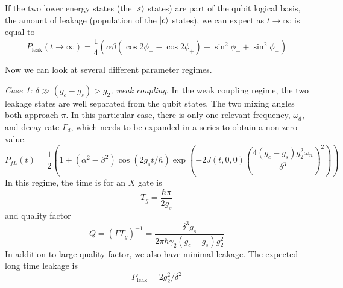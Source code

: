 If the two lower energy states (the $\ket{s}$ states) are part of the qubit logical basis, the amount of leakage (population of the $\ket{c}$ states), we can expect as $t\rightarrow\infty$ is equal to
\begin{equation}
    P_\textrm{leak}(t\rightarrow\infty) = \frac{1}{4}\left( \alpha\beta(\cos2\phi_--\cos2\phi_+) + \sin^2\phi_++\sin^2\phi_-\right)
    \label{leakage}
\end{equation}

Now we can look at several different parameter regimes.

\emph{Case 1: $\delta \gg (g_c-g_s) > g_{2}$, weak coupling}. In the weak coupling regime, the two leakage states are well separated from the qubit states. The two mixing angles both approach $\pi$. In this particular case, there is only one relevant frequency, $\omega_d$, and decay rate $\Gamma_d$, which needs to be expanded in a series to obtain a non-zero value.
\begin{equation}
    P_{fL}(t) = \frac{1}{2}\left(1 + (\alpha^2-\beta^2)\cos(2g_st/\hbar)\exp\left(-2J(t,0,0)\left(\frac{4(g_c-g_s)g_{2}^2\omega_n}{\delta^3}\right)^2\right)\right)
\end{equation}
In this regime, the time is for an $X$ gate is
\begin{equation}
    T_{g} = \frac{\hbar\pi}{2g_s}
\end{equation}
and quality factor
\begin{equation}
    Q = (\Gamma T_g)^{-1} = \frac{\delta^3g_s}{2\pi\hbar\gamma_2(g_c-g_s)g_{2}^2}
\end{equation}
In addition to large quality factor, we also have minimal leakage. The expected long time leakage is
\begin{equation}
    P_\textrm{leak} = 2g_{2}^2/\delta^2
\end{equation}

